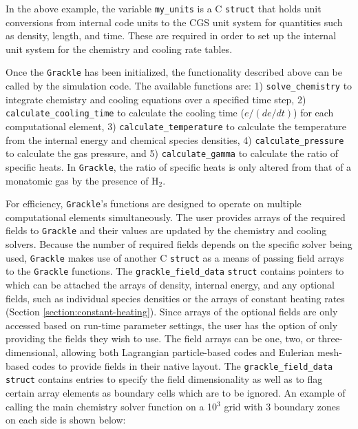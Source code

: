 In the above example, the variable \texttt{my\_units} is a C
\texttt{struct} that holds unit conversions from internal code units
to the CGS unit system for quantities such as density, length, and
time.  These are required in order to set up the internal unit system
for the chemistry and cooling rate tables.

Once the \texttt{Grackle} has been initialized, the functionality described
above can be called by the simulation code.  The available functions
are: 1) \texttt{solve\_chemistry} to integrate chemistry and cooling
equations over a specified time step, 2)
\texttt{calculate\_cooling\_time} to calculate the cooling time
($e/(de/dt)$) for each computational element, 3)
\texttt{calculate\_temperature} to calculate the temperature from the
internal energy and chemical species densities, 4)
\texttt{calculate\_pressure} to calculate the gas pressure, and 5)
\texttt{calculate\_gamma} to calculate the ratio of specific heats.
In \texttt{Grackle}, the ratio of specific heats is only altered from that
of a monatomic gas by the presence of H$_{2}$.

For efficiency, \texttt{Grackle}'s functions are designed to operate on
multiple computational elements simultaneously.  The user provides
arrays of the required fields to \texttt{Grackle} and their values are
updated by the chemistry and cooling solvers.  Because the number of
required fields depends on the specific solver being used, \texttt{Grackle}
makes use of another C \texttt{struct} as a means of passing field
arrays to the \texttt{Grackle} functions.  The \texttt{grackle\_field\_data}
\texttt{struct} contains pointers to which can be attached the arrays
of density, internal energy, and any optional fields, such as
individual species densities or the arrays of constant heating rates
(Section \ref{section:constant-heating}).  Since arrays of the
optional fields are only accessed based on run-time parameter
settings, the user has the option of only providing the fields they
wish to use.  The field arrays can be one, two, or three-dimensional,
allowing both Lagrangian particle-based codes and Eulerian mesh-based
codes to provide fields in their native layout.  The
\texttt{grackle\_field\_data} \texttt{struct} contains entries to
specify the field dimensionality as well as to flag certain array
elements as boundary cells which are to be ignored.  An example of
calling the main chemistry solver function on a 10$^{3}$ grid with 3
boundary zones on each side is shown below:

